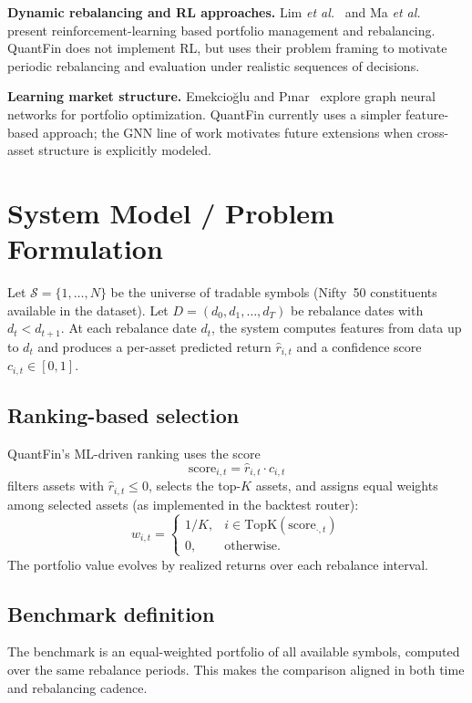 \documentclass[conference]{IEEEtran}
\begin{document}
\textbf{Dynamic rebalancing and RL approaches.} Lim \emph{et al.}~\cite{lim2022dynamicrebalancing} and Ma \emph{et al.}~\cite{ma2023tcr} present reinforcement-learning based portfolio management and rebalancing. QuantFin does not implement RL, but uses their problem framing to motivate periodic rebalancing and evaluation under realistic sequences of decisions.

\textbf{Learning market structure.} Emekcio{\u{g}}lu and P{\i}nar~\cite{emekcioglu2023gnn} explore graph neural networks for portfolio optimization. QuantFin currently uses a simpler feature-based approach; the GNN line of work motivates future extensions when cross-asset structure is explicitly modeled.

\section{System Model / Problem Formulation}\label{sec:form}
Let $\mathcal{S}=\{1,\dots,N\}$ be the universe of tradable symbols (Nifty~50 constituents available in the dataset). Let $D = (d_0, d_1, \dots, d_T)$ be rebalance dates with $d_{t} < d_{t+1}$. At each rebalance date $d_t$, the system computes features from data up to $d_t$ and produces a per-asset predicted return $\widehat{r}_{i,t}$ and a confidence score $c_{i,t}\in[0,1]$.

\subsection{Ranking-based selection}
QuantFin's ML-driven ranking uses the score
\begin{equation}
\mathrm{score}_{i,t} = \widehat{r}_{i,t} \cdot c_{i,t}
\end{equation}
filters assets with $\widehat{r}_{i,t} \le 0$, selects the top-$K$ assets, and assigns equal weights among selected assets (as implemented in the backtest router):
\begin{equation}
 w_{i,t} =
 \begin{cases}
  1/K, & i \in \mathrm{TopK}(\mathrm{score}_{\cdot,t}) \\
  0, & \text{otherwise.}
 \end{cases}
\end{equation}
The portfolio value evolves by realized returns over each rebalance interval.

\subsection{Benchmark definition}
The benchmark is an equal-weighted portfolio of all available symbols, computed over the same rebalance periods. This makes the comparison aligned in both time and rebalancing cadence.
\end{document}
